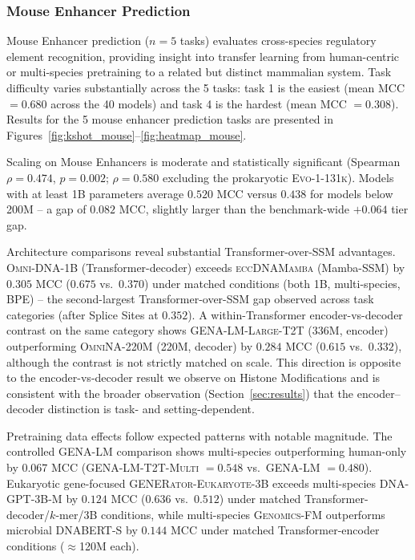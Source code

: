 \documentclass{llmxive}
\begin{document}
\subsubsection{Mouse Enhancer Prediction}

Mouse Enhancer prediction ($n=5$ tasks) evaluates cross-species
regulatory element recognition, providing insight into transfer
learning from human-centric or multi-species pretraining to a
related but distinct mammalian system. Task difficulty varies
substantially across the 5 tasks: task 1 is the easiest (mean MCC
$= 0.680$ across the 40 models) and task 4 is the hardest (mean
MCC $= 0.308$). Results for the 5 mouse enhancer prediction tasks
are presented in
Figures~\ref{fig:kshot_mouse}--\ref{fig:heatmap_mouse}.


Scaling on Mouse Enhancers is moderate and statistically
significant (Spearman $\rho = 0.474$, $p = 0.002$; $\rho = 0.580$
excluding the prokaryotic \textsc{Evo-1-131k}). Models with at
least 1B parameters average $0.520$ MCC versus $0.438$ for models
below 200M -- a gap of $0.082$ MCC, slightly larger than the
benchmark-wide $+0.064$ tier gap.

Architecture comparisons reveal substantial Transformer-over-SSM
advantages. \textsc{Omni-DNA-1B} (Transformer-decoder) exceeds
\textsc{eccDNAMamba} (Mamba-SSM) by $0.305$ MCC ($0.675$
vs.\ $0.370$) under matched conditions (both 1B, multi-species,
BPE) -- the second-largest Transformer-over-SSM gap observed
across task categories (after Splice Sites at $0.352$). A
within-Transformer encoder-vs-decoder contrast on the same
category shows \textsc{GENA-LM-Large-T2T} (336M, encoder)
outperforming \textsc{OmniNA-220M} (220M, decoder) by $0.284$ MCC
($0.615$ vs.\ $0.332$), although the contrast is not strictly
matched on scale. This direction is opposite to the
encoder-vs-decoder result we observe on Histone Modifications and
is consistent with the broader observation
(Section~\ref{sec:results}) that the encoder--decoder distinction
is task- and setting-dependent.


Pretraining data effects follow expected patterns with notable
magnitude. The controlled \textsc{GENA-LM} comparison shows
multi-species outperforming human-only by $0.067$ MCC
(\textsc{GENA-LM-T2T-Multi} $= 0.548$ vs.\ \textsc{GENA-LM} $=
0.480$). Eukaryotic gene-focused \textsc{GENERator-Eukaryote-3B}
exceeds multi-species \textsc{DNA-GPT-3B-M} by $0.124$ MCC ($0.636$
vs.\ $0.512$) under matched Transformer-decoder/$k$-mer/3B
conditions, while multi-species \textsc{Genomics-FM} outperforms
microbial \textsc{DNABERT-S} by $0.144$ MCC under matched
Transformer-encoder conditions ($\approx$120M each).
\end{document}
